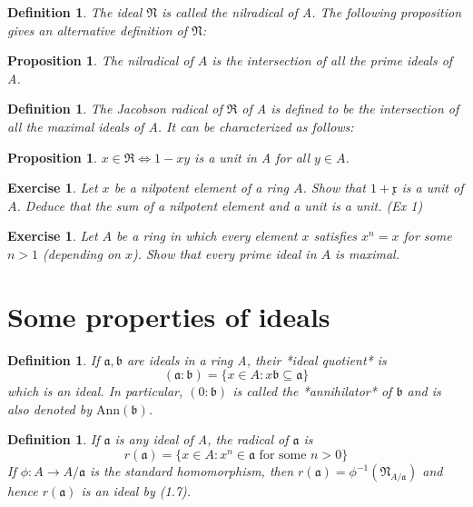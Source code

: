 \documentclass[]{report}
\newtheorem{prop}[theorem]{Proposition}
\newtheorem{defn}[theorem]{Definition}
\newtheorem{exercise}[theorem]{Exercise}
\begin{document}
\begin{defn}
    The ideal $\mathfrak{N}$ is called the nilradical of A. The following proposition gives an alternative definition of $\mathfrak{N}$:
\end{defn}

\begin{prop}
    The nilradical of $A$ is the intersection of all the prime ideals of A.
\end{prop}

\begin{defn}
    The Jacobson radical of $\mathfrak{R}$ of A is defined to be the intersection of all the maximal ideals of A. It can be characterized as follows:
\end{defn}

\begin{prop}
    $x\in \mathfrak{R} \Leftrightarrow 1-xy$ is a unit in A for all $y\in A$.
\end{prop}

\begin{exercise}
    Let $x$ be a nilpotent element of a ring $A$. Show that $\mathfrak{1+x}$ is a unit of $A$. Deduce that the sum of a nilpotent element and a unit is a unit. (Ex 1)
\end{exercise}

\begin{exercise}
    Let $A$ be a ring in which every element $x$ satisfies $x^n=x$ for some $n>1$ (depending on $x$). Show that every prime ideal in $A$ is maximal.
\end{exercise}

\section{Some properties of ideals}

\begin{defn}
    If $\mathfrak{a, b}$ are ideals in a ring A, their *ideal quotient* is 
$$\mathfrak{(a:b)} = \{x\in A: x\mathfrak{b\subseteq a}\}$$
which is an ideal. 
In particular, $(0:\mathfrak{b})$ is called the *annihilator* of $\mathfrak{b}$ and is also denoted by $\text{Ann}(\mathfrak{b})$.
\end{defn}

\begin{defn}
    If $\mathfrak{a}$ is any ideal of A, the radical of $\mathfrak{a}$ is
$$r(\mathfrak{a}) = \{x\in A: x^n\in \mathfrak{a} \text{ for some } n>0\}$$
If $\phi: A\rightarrow A/\mathfrak{a}$ is the standard homomorphism, then $r(\mathfrak{a}) = \phi^{-1}(\mathfrak{N}_{A/\mathfrak{a}})$ and hence $r(\mathfrak{a})$ is an ideal by (1.7).
\end{defn}
\end{document}
